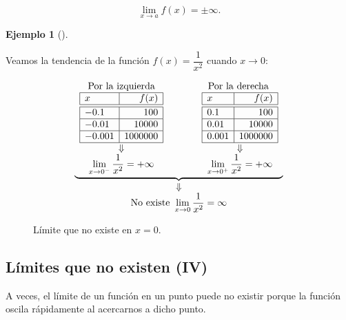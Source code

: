\documentclass[
  a4paper,
]{scrreport}
\theoremstyle{definition}
\newtheorem{example}{Ejemplo}[chapter]
\theoremstyle{plain}
\theoremstyle{definition}
\theoremstyle{definition}
\theoremstyle{plain}
\theoremstyle{plain}
\theoremstyle{remark}
\begin{document}
\[\lim_{x\to a}f(x)=\pm \infty.\]

\begin{example}[]\protect\hypertarget{exm-limites-no-existen-3}{}\label{exm-limites-no-existen-3}

Veamos la tendencia de la función \(f(x)=\dfrac{1}{x^2}\) cuando
\(x\to 0\):

\[
\begin{array}{c}
\underbrace{\begin{array}{ccc}
\mbox{Por la izquierda} & \qquad & \mbox{Por la derecha }\\
\begin{array}{|l|r|}
\hline
x      & f(x)   \\
\hline\hline
 -0.1   & 100       \\
\hline
 -0.01   & 10000     \\
\hline
 -0.001  & 1000000   \\
\hline
\end{array}
& &
\begin{array}{|l|r|}
\hline
x      & f(x)   \\
\hline\hline
 0.1    & 100       \\
\hline
 0.01   & 10000    \\
\hline
 0.001  & 1000000   \\
\hline
\end{array}\\
\Downarrow & & \Downarrow\\
\displaystyle \lim_{x\to 0^-}\frac{1}{x^2}=+\infty
& &
\displaystyle \lim_{x\to 0^+}\frac{1}{x^2}=+\infty
\end{array}}\\
\Downarrow\\
\displaystyle \mbox{No existe }\lim_{x\to 0}\frac{1}{x^2}=\infty
\end{array}
\]

\begin{figure}
\centering

\caption{Límite que no existe en \(x=0\).}
\end{figure}

\end{example}

\subsection{Límites que no existen
(IV)}\label{luxedmites-que-no-existen-iv}

A veces, el límite de un función en un punto puede no existir porque la
función oscila rápidamente al acercarnos a dicho punto.
\end{document}
